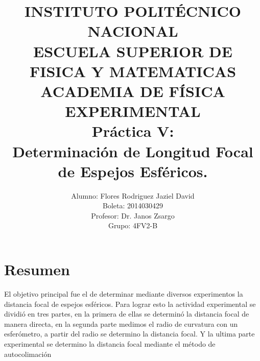 \documentclass[13,twocolumn,letterpaper]{article}
\title{
    		\usefont{OT1}{bch}{b}{n}
    		\normalfont \normalsize \textsc{INSTITUTO POLITÉCNICO NACIONAL \\ 
    		ESCUELA SUPERIOR DE FISICA Y MATEMATICAS \\
    		ACADEMIA DE FÍSICA EXPERIMENTAL} \\ [10pt]
    		\huge Práctica V:\\
    Determinaci\'on de Longitud Focal de Espejos Esféricos.\\
    }
\author[0]{Alumno: Flores Rodriguez Jaziel David \\
    Boleta: 2014030429 \\
    Profesor: Dr. Janos Zsargo\\
    Grupo: 4FV2-B \\
            }
\begin{document}
\maketitle
 \section*{Resumen}
El objetivo principal fue el de determinar mediante diversos experimentos la distancia focal de espejos esféricos. Para lograr esto la actividad experimental se dividi\'o en tres partes, en la primera de ellas se determinó la distancia focal de manera directa, en la segunda parte medimos el radio de curvatura con un esferómetro, a partir del radio se determino la distancia focal.  Y la ultima parte experimental se determino la distancia focal mediante el método de autocolimación

\\
\end{document}
